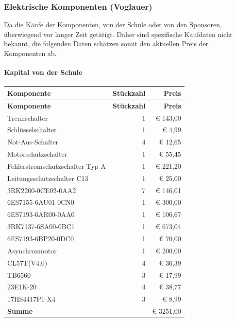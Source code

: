 \newpage
\subsubsection{Elektrische Komponenten (Voglauer)}
Da die Käufe der Komponenten, von der Schule oder von den Sponsoren, überwiegend vor langer Zeit getätigt. Daher sind spezifische Kaufdaten nicht bekannt, die folgenden Daten schätzen somit den aktuellen Preis der Komponenten ab.\\ 
\paragraph{Kapital von der Schule}
\begin{longtable}{|p{7cm}|r|r|}
    \hline
    \textbf{Komponente} & \textbf{Stückzahl} & \textbf{Preis} \\
    \hline
    \endfirsthead

    \hline
    \textbf{Komponente} & \textbf{Stückzahl} & \textbf{Preis} \\
    \hline
    \endhead

    \hline
    \endfoot

    \hline
    \endlastfoot
    Trennschalter & 1 & € 143,00 \\
    Schlüsselschalter & 1 & € 4,99 \\
    Not-Aus-Schalter & 4 & € 12,65 \\
    Motorschutzschalter & 1 & € 55,45 \\
    Fehlerstromschutzschalter Typ A & 1 & € 221,20 \\
    Leitungsschutzschalter C13 & 1 & € 25,00 \\
    3RK2200-0CE02-0AA2 & 7 & € 146,01 \\
    6ES7155-6AU01-0CN0 & 1 & € 300,00 \\
    6ES7193-6AR00-0AA0 & 1 & € 106,67 \\
    3RK7137-6SA00-0BC1 & 1 & € 673,04 \\
    6ES7193-6BP20-0DC0 & 1 & € 70,00 \\
    Asynchronmotor & 1 & € 200,00 \\
    CL57T(V4.0) & 4 & € 36,39 \\
    TB6560 & 3 & € 17,99 \\
    23E1K-20 & 4 & € 38,77 \\
    17HS4417P1-X4 & 3 & € 8,99 \\
    \textbf{Summe} & & € 3251,00\\
    \hline
    \hline
\end{longtable}
